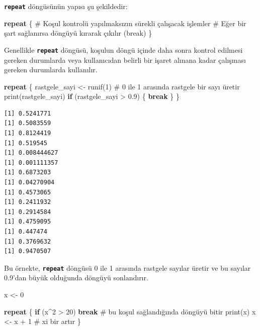 \documentclass[
  letterpaper,
  DIV=11,
  numbers=noendperiod]{scrreprt}
\newenvironment{Shaded}{\begin{snugshade}}{\end{snugshade}}
\newcommand{\CommentTok}[1]{\textcolor[rgb]{0.37,0.37,0.37}{#1}}
\newcommand{\ControlFlowTok}[1]{\textcolor[rgb]{0.00,0.23,0.31}{\textbf{#1}}}
\newcommand{\DecValTok}[1]{\textcolor[rgb]{0.68,0.00,0.00}{#1}}
\newcommand{\FloatTok}[1]{\textcolor[rgb]{0.68,0.00,0.00}{#1}}
\newcommand{\FunctionTok}[1]{\textcolor[rgb]{0.28,0.35,0.67}{#1}}
\newcommand{\NormalTok}[1]{\textcolor[rgb]{0.00,0.23,0.31}{#1}}
\newcommand{\OtherTok}[1]{\textcolor[rgb]{0.00,0.23,0.31}{#1}}
\newcommand{\SpecialCharTok}[1]{\textcolor[rgb]{0.37,0.37,0.37}{#1}}
\begin{document}
\textbf{\texttt{repeat}} döngüsünün yapısı şu şekildedir:

\begin{Shaded}
\begin{Highlighting}[]
\ControlFlowTok{repeat}\NormalTok{ \{}
  \CommentTok{\# Koşul kontrolü yapılmaksızın sürekli çalışacak işlemler}
  \CommentTok{\# Eğer bir şart sağlanırsa döngüyü kırarak çıkılır (break)}
\NormalTok{\}}
\end{Highlighting}
\end{Shaded}

Genellikle \textbf{\texttt{repeat}} döngüsü, koşulun döngü içinde daha
sonra kontrol edilmesi gereken durumlarda veya kullanıcıdan belirli bir
işaret alınana kadar çalışması gereken durumlarda kullanılır.

\begin{Shaded}
\begin{Highlighting}[]
\ControlFlowTok{repeat}\NormalTok{ \{}
\NormalTok{  rastgele\_sayi }\OtherTok{\textless{}{-}} \FunctionTok{runif}\NormalTok{(}\DecValTok{1}\NormalTok{)  }\CommentTok{\# 0 ile 1 arasında rastgele bir sayı üretir}
  \FunctionTok{print}\NormalTok{(rastgele\_sayi)}
  \ControlFlowTok{if}\NormalTok{ (rastgele\_sayi }\SpecialCharTok{\textgreater{}} \FloatTok{0.9}\NormalTok{) \{}
    \ControlFlowTok{break}
\NormalTok{  \}}
\NormalTok{\}}
\end{Highlighting}
\end{Shaded}

\begin{verbatim}
[1] 0.5241771
[1] 0.5083559
[1] 0.8124419
[1] 0.519545
[1] 0.008444627
[1] 0.001111357
[1] 0.6873203
[1] 0.04270904
[1] 0.4573065
[1] 0.2411932
[1] 0.2914584
[1] 0.4759095
[1] 0.447474
[1] 0.3769632
[1] 0.9470507
\end{verbatim}

Bu örnekte, \textbf{\texttt{repeat}} döngüsü 0 ile 1 arasında rastgele
sayılar üretir ve bu sayılar 0.9'dan büyük olduğunda döngüyü
sonlandırır.

\begin{Shaded}
\begin{Highlighting}[]
\NormalTok{x }\OtherTok{\textless{}{-}} \DecValTok{0}

\ControlFlowTok{repeat}\NormalTok{ \{}
    \ControlFlowTok{if}\NormalTok{ (x}\SpecialCharTok{\^{}}\DecValTok{2} \SpecialCharTok{\textgreater{}} \DecValTok{20}\NormalTok{) }\ControlFlowTok{break}     \CommentTok{\# bu koşul sağlandığında döngüyü bitir}
    \FunctionTok{print}\NormalTok{(x)               }
\NormalTok{    x }\OtherTok{\textless{}{-}}\NormalTok{ x }\SpecialCharTok{+} \DecValTok{1}              \CommentTok{\# x\textquotesingle{}i bir artır}
\NormalTok{\}}
\end{Highlighting}
\end{Shaded}
\end{document}

